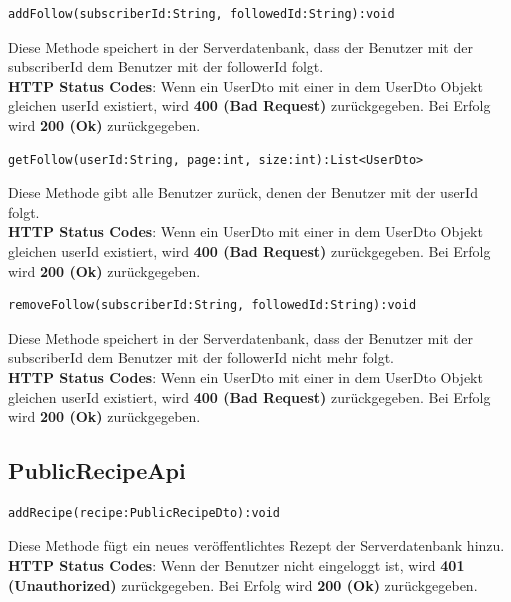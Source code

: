 \begin{lstlisting}
addFollow(subscriberId:String, followedId:String):void
\end{lstlisting}
Diese Methode speichert in der Serverdatenbank, dass der Benutzer mit der subscriberId dem Benutzer mit der followerId folgt.\\
\textbf{HTTP Status Codes}:
Wenn ein UserDto mit einer in dem UserDto Objekt gleichen userId existiert, wird \textbf{400 (Bad Request)} zurückgegeben. Bei Erfolg wird \textbf{200 (Ok)} zurückgegeben.
\vspace{1cm}
\begin{lstlisting}
getFollow(userId:String, page:int, size:int):List<UserDto>
\end{lstlisting}
Diese Methode gibt alle Benutzer zurück, denen der Benutzer mit der userId folgt.\\
\textbf{HTTP Status Codes}:
Wenn ein UserDto mit einer in dem UserDto Objekt gleichen userId existiert, wird \textbf{400 (Bad Request)} zurückgegeben. Bei Erfolg wird \textbf{200 (Ok)} zurückgegeben.
\vspace{1cm}

\begin{lstlisting}
removeFollow(subscriberId:String, followedId:String):void
\end{lstlisting}
Diese Methode speichert in der Serverdatenbank, dass der Benutzer mit der subscriberId dem Benutzer mit der followerId nicht mehr folgt.\\
\textbf{HTTP Status Codes}:
Wenn ein UserDto mit einer in dem UserDto Objekt gleichen userId existiert, wird \textbf{400 (Bad Request)} zurückgegeben. Bei Erfolg wird \textbf{200 (Ok)} zurückgegeben.
\vspace{1cm}



\subsection{PublicRecipeApi}

\vspace{1cm}  
 \begin{lstlisting}
addRecipe(recipe:PublicRecipeDto):void
\end{lstlisting}
Diese Methode fügt ein neues veröffentlichtes Rezept der Serverdatenbank hinzu.\\
\textbf{HTTP Status Codes}:
Wenn der Benutzer nicht eingeloggt ist, wird \textbf{401 (Unauthorized)} zurückgegeben. Bei Erfolg wird \textbf{200 (Ok)} zurückgegeben.
\vspace{1cm}

